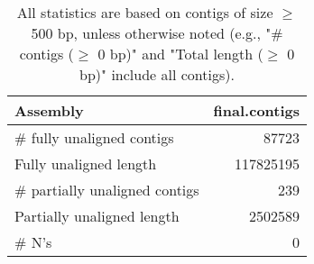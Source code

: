 \documentclass[12pt,a4paper]{article}
\begin{document}
\begin{table}[ht]
\begin{center}
\caption{All statistics are based on contigs of size $\geq$ 500 bp, unless otherwise noted (e.g., "\# contigs ($\geq$ 0 bp)" and "Total length ($\geq$ 0 bp)" include all contigs).}
\begin{tabular}{|l*{1}{|r}|}
\hline
Assembly & final.contigs \\ \hline
\# fully unaligned contigs & 87723 \\ \hline
Fully unaligned length & 117825195 \\ \hline
\# partially unaligned contigs & 239 \\ \hline
Partially unaligned length & 2502589 \\ \hline
\# N's & 0 \\ \hline
\end{tabular}
\end{center}
\end{table}
\end{document}
